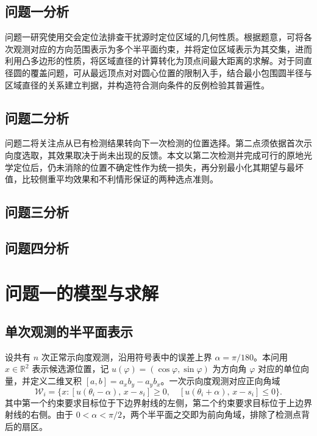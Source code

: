 \documentclass[UTF8,a4paper,zihao=-4,fontset=none]{ctexart}
\begin{document}
\subsection{问题一分析}

问题一研究使用交会定位法排查干扰源时定位区域的几何性质。根据题意，可将各次观测对应的方向范围表示为多个半平面约束，并将定位区域表示为其交集，进而利用凸多边形的性质，将区域直径的计算转化为顶点间最大距离的求解。对于同直径圆的覆盖问题，可从最远顶点对对圆心位置的限制入手，结合最小包围圆半径与区域直径的关系建立判据，并构造符合测向条件的反例检验其普遍性。

\subsection{问题二分析}

问题二将关注点从已有检测结果转向下一次检测的位置选择。第二点须依据首次示向度选取，其效果取决于尚未出现的反馈。本文以第二次检测并完成可行的原地光学定位后，仍未消除的位置不确定性作为统一损失，再分别最小化其期望与最坏值，比较侧重平均效果和不利情形保证的两种选点准则。
\subsection{问题三分析}


\subsection{问题四分析}


\section{问题一的模型与求解}

\subsection{单次观测的半平面表示}

设共有 \(n\) 次正常示向度观测，沿用符号表中的误差上界 \(\alpha=\pi/180\)。本问用 \(x\in\mathbb R^2\) 表示候选源位置，记 \(u(\varphi)=(\cos\varphi,\sin\varphi)\) 为方向角 \(\varphi\) 对应的单位向量，并定义二维叉积 \([a,b]=a_xb_y-a_yb_x\)。一次示向度观测对应正向角域
\begin{equation}
  \mathcal W_i=\{x:[u(\theta_i-\alpha),\,x-s_i]\ge0,\quad [u(\theta_i+\alpha),\,x-s_i]\le0\}.
  \label{eq:wedge}
\end{equation}
其中第一个约束要求目标位于下边界射线的左侧，第二个约束要求目标位于上边界射线的右侧。由于 \(0<\alpha<\pi/2\)，两个半平面之交即为前向角域，排除了检测点背后的扇区。
\end{document}
